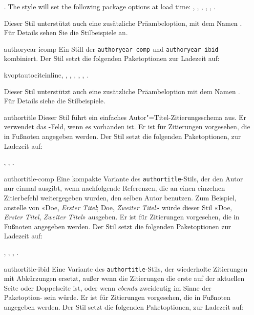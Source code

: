 \documentclass{ltxdockit}[2011/03/25]
\begin{document}
\begin{marglist}
 . The style will set the following package options at load time: , , , , , .

Dieser Stil
unterstützt auch eine zusätzliche Präambeloption, mit dem Namen .
Für Details sehen Sie die Stilbeispiele an.

\item[authoryear-icomp] Ein Still der \texttt{authoryear-comp} 
und \texttt{authoryear-ibid} kombiniert.
Der Stil setzt die folgenden Paketoptionen zur Ladezeit auf:

kvopt{autocite}{inline}, , , , , , .


Dieser Stil unterstützt auch eine zusätzliche
Präambeloption mit dem Namen . Für Details siehe die
Stilbeispiele. 

\item[authortitle] Dieser Stil führt ein einfaches
Autor"=Titel-Zitierungsschema aus. Er verwendet
das -Feld, wenn es vorhanden ist. Er ist für Zitierungen
vorgesehen, die in Fußnoten angegeben werden. Der Stil setzt die folgenden
Paketoptionen, zur Ladezeit auf: 

, , .

\item[authortitle-comp] Eine kompakte Variante des \texttt{authortitle}-Stils,
der den Autor nur einmal
ausgibt, wenn nachfolgende Referenzen, die an einen einzelnen Zitierbefehl
weitergegeben wurden, den selben Autor benutzen. Zum Beispiel, anstelle von
«Doe, \emph{Erster Titel}; Doe, \emph{Zweiter Titel}» würde dieser Stil «Doe,
\emph{Erster Titel}, \emph{Zweiter Titel}» ausgeben. Er ist für Zitierungen
vorgesehen, die in Fußnoten angegeben werden. Der Stil setzt die folgenden
Paketoptionen zur Ladezeit auf:

, , , .

\item[authortitle-ibid] Eine Variante des \texttt{authortitle}-Stils, 
der wiederholte Zitierungen mit
Abkürzungen ersetzt, außer wenn die Zitierungen die erste auf der aktuellen
Seite oder Doppelseite ist, oder wenn \emph{ebenda} zweideutig im Sinne der
Paketoption- sein würde. Er ist für Zitierungen
vorgesehen, die in Fußnoten angegeben werden. Der Stil setzt die folgenden
Paketoptionen, zur Ladezeit auf: 


\end{marglist}
\end{document}
